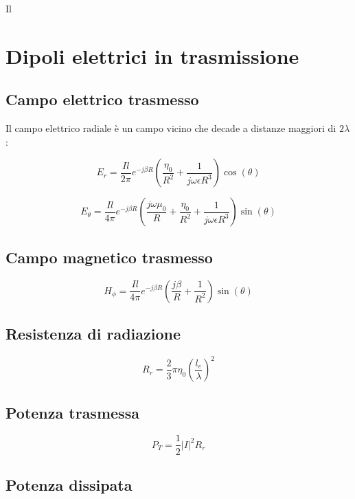 \documentclass[10pt,a4paper]{report}
\begin{document}
	    Il
	 \section{Dipoli elettrici in trasmissione}

		\subsection{Campo elettrico trasmesso}

		Il campo elettrico radiale è un campo vicino che decade a distanze maggiori di $2\lambda$:
		
		\begin{equation}
		E_r=\frac{I{l}}{2\pi}e^{-j\beta R}(\frac{ \eta_0}{R^2}+\frac{1}{j \omega \epsilon R^3})\cos(\theta)
		\end{equation}
		
		\begin{equation}
		 E_{\theta} = \frac {Il} {4\pi} e^{-j\beta R} ( \frac {j\omega \mu_0} {R} + \frac {\eta_0} {R^2} + \frac {1}  {j \omega \epsilon R^3} ) \sin(\theta)
		\end{equation}

		\subsection{Campo magnetico trasmesso}

		\begin{equation}
		H_{\phi}=\frac{Il}{4\pi}e^{-j\beta R}(\frac{j \beta}{R}+\frac{1}{R^2})\sin(\theta)
		\end{equation}
		\subsection{Resistenza di radiazione}			
				\begin{equation}
				R_r=\frac{2}{3}\pi\eta_0(\frac{l_e}{\lambda})^2
				\end{equation}



		\subsection{Potenza trasmessa}

	  \begin{equation}
	  P_T=\frac{1}{2}|I|^2R_r
	  \end{equation}

	  	\subsection{Potenza dissipata}
\end{document}
